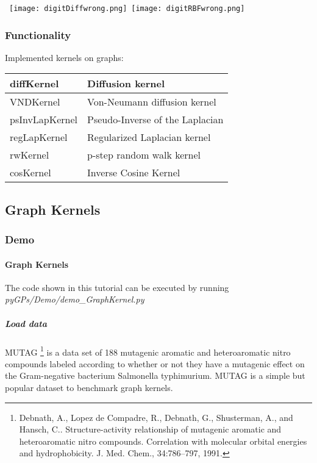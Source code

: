 \documentclass[letterpaper,10pt,english]{sphinxmanual}
\begin{document}
\mbox{
  \texttt{[image: digitDiffwrong.png]}
  \texttt{[image: digitRBFwrong.png]}}


\subsubsection{Functionality}
\label{Graph:functionality}
Implemented kernels on graphs:

\begin{tabulary}{\linewidth}{|L|L|}
\hline

diffKernel
 & 
Diffusion kernel
\\\hline

VNDKernel
 & 
Von-Neumann diffusion kernel
\\\hline

psInvLapKernel
 & 
Pseudo-Inverse of the Laplacian
\\\hline

regLapKernel
 & 
Regularized Laplacian kernel
\\\hline

rwKernel
 & 
p-step random walk kernel
\\\hline

cosKernel
 & 
Inverse Cosine Kernel
\\\hline
\end{tabulary}



\subsection{Graph Kernels}
\label{Graph:graph-kernels}

\subsubsection{Demo}
\label{Graph:id1}

\paragraph{Graph Kernels}
\label{GraphKernel:graph-kernels}\label{GraphKernel::doc}
The code shown in this tutorial can be executed by running \emph{pyGPs/Demo/demo\_GraphKernel.py}


\subparagraph{Load data}
\label{GraphKernel:load-data}
MUTAG \footnote{
Debnath, A., Lopez de Compadre, R., Debnath, G., Shusterman, A., and Hansch, C.. Structure-activity relationship of mutagenic aromatic and heteroaromatic nitro compounds. Correlation with molecular orbital energies and hydrophobicity. J. Med. Chem., 34:786–797, 1991.
} is a data set of 188 mutagenic aromatic and heteroaromatic
nitro compounds labeled according to whether or not they have a mutagenic effect on the
Gram-negative bacterium Salmonella typhimurium. MUTAG is a simple but popular dataset
to benchmark graph kernels.
\end{document}
